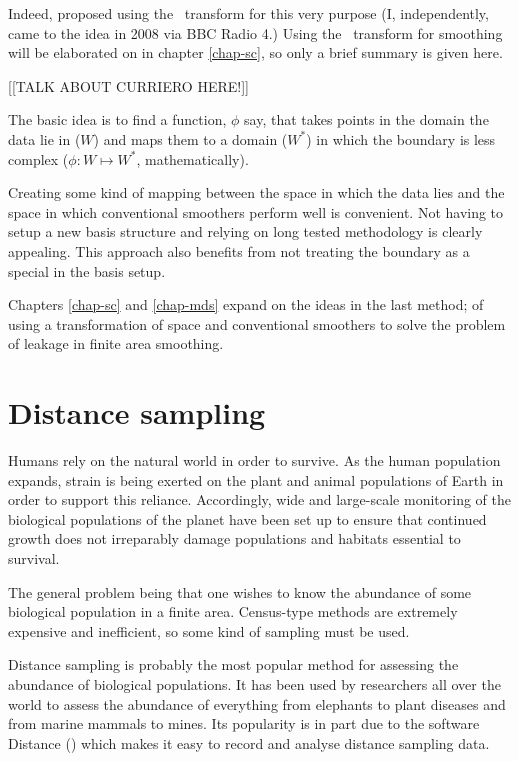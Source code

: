 \begin{enumerate}
Indeed, \cite{eilerstalk} proposed using the \sch\ transform for this very purpose (I, independently, came to the idea in 2008 via BBC Radio 4.) Using the \sch\ transform for smoothing will be elaborated on in chapter \ref{chap-sc}, so only a brief summary is given here.

[[TALK ABOUT CURRIERO HERE!]]

The basic idea is to find a function, $\phi$ say, that takes points in the domain the data lie in ($W$) and maps them to a domain ($W^*$) in which the boundary is less complex ($\phi : W \mapsto W^*$, mathematically).

Creating some kind of mapping between the space in which the data lies and the space in which conventional smoothers perform well is convenient. Not having to setup a new basis structure and relying on long tested methodology is clearly appealing. This approach also benefits from not treating the boundary as a special in the basis setup.
\end{enumerate}

Chapters \ref{chap-sc} and \ref{chap-mds} expand on the ideas in the last method; of using a transformation of space and conventional smoothers to solve the problem of leakage in finite area smoothing.

\section{Distance sampling}

Humans rely on the natural world in order to survive. As the human population expands, strain is being exerted on the plant and animal populations of Earth in order to support this reliance. Accordingly, wide and large-scale monitoring of the biological populations of the planet have been set up to ensure that continued growth does not irreparably damage populations and habitats essential to survival.

The general problem being that one wishes to know the abundance of some biological population in a finite area. Census-type methods are extremely expensive and inefficient, so some kind of sampling must be used. 

Distance sampling is probably the most popular method for assessing the abundance of biological populations. It has been used by researchers all over the world to assess the abundance of everything from elephants to plant diseases and from marine mammals to mines. Its popularity is in part due to the software Distance (\cite{distance-software}) which makes it easy to record and analyse distance sampling data.



